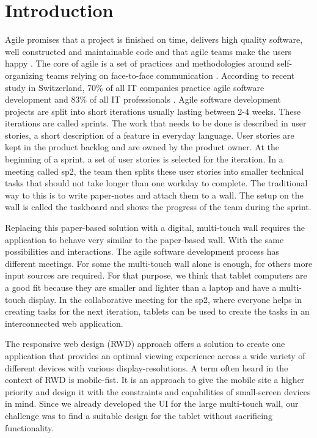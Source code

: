 \documentclass{sigchi}
\begin{document}

\section{Introduction}
Agile promises that a project is finished on time, delivers high quality software, well constructed and maintainable code and that agile teams make the users happy \cite{Stellman:2014}.
The core of agile is a set of practices and methodologies around self-organizing teams relying on face-to-face communication \cite{Cockburn:2001}.
According to recent study in Switzerland, 70\% of all IT companies practice agile software development and 83\% of all IT professionals \cite{Kropp:2015}.
Agile software development projects are split into short iterations usually lasting between 2-4 weeks.
These iterations are called sprints.
The work that needs to be done is described in user stories, a short description of a feature in everyday language.
User stories are kept in the product backlog and are owned by the product owner.
At the beginning of a sprint, a set of user stories is selected for the iteration.
In a meeting called \gls{sp2}, the team then splits these user stories into smaller technical tasks that should not take longer than one workday to complete.
The traditional way to this is to write paper-notes and attach them to a wall.
The setup on the wall is called the taskboard and shows the progress of the team during the sprint.

Replacing this paper-based solution with a digital, multi-touch wall requires the application to behave very similar to the paper-based wall. 
With the same possibilities and interactions.
The agile software development process has different meetings. 
For some the multi-touch wall alone is enough, for others more input sources are required. 
For that purpose, we think that tablet computers are a good fit because they are smaller and lighter than a laptop and have a multi-touch display. 
In the collaborative meeting for the \gls{sp2}, where everyone helps in creating tasks for the next iteration, tablets can be used to create the tasks in an interconnected web application.

The responsive web design (RWD) approach offers a solution to create one application that provides an optimal viewing experience across a wide variety of different devices with various display-resolutions. 
A term often heard in the context of RWD is mobile-fist. 
It is an approach to give the mobile site a higher priority and design it with the constraints and capabilities of small-screen devices in mind. 
Since we already developed the UI for the large multi-touch wall, our challenge was to find a suitable design for the tablet without sacrificing functionality.
\end{document}
